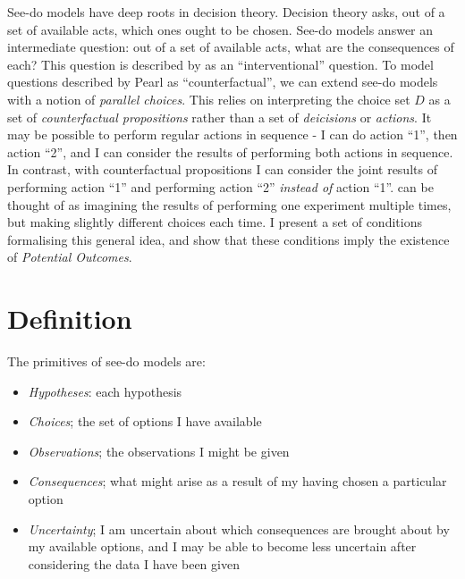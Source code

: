 See-do models have deep roots in decision theory. Decision theory asks, out of a set of available acts, which ones ought to be chosen. See-do models answer an intermediate question: out of a set of available acts, what are the consequences of each? This question is described by \citet{pearl_causality:_2009} as an ``interventional'' question. To model questions described by Pearl as ``counterfactual'', we can extend see-do models with a notion of \emph{parallel choices}.  This relies on interpreting the choice set $D$ as a set of \emph{counterfactual propositions} rather than a set of \emph{deicisions} or \emph{actions}. It may be possible to perform regular actions in sequence - I can do action ``1'', then action ``2'', and I can consider the results of performing both actions in sequence. In contrast, with counterfactual propositions I can consider the joint results of performing action ``1'' and performing action ``2'' \emph{instead of} action ``1''. can be thought of as imagining the results of performing one experiment multiple times, but making slightly different choices each time. I present a set of conditions formalising this general idea, and show that these conditions imply the existence of \emph{Potential Outcomes}. 

\section{Definition}

The primitives of see-do models are:

\begin{itemize}
    \item \emph{Hypotheses}: each hypothesis  
    \item \emph{Choices}; the set of options I have available
    \item \emph{Observations}; the observations I might be given
    \item \emph{Consequences}; what might arise as a result of my having chosen a particular option
    \item \emph{Uncertainty}; I am uncertain about which consequences are brought about by my available options, and I may be able to become less uncertain after considering the data I have been given
\end{itemize}

